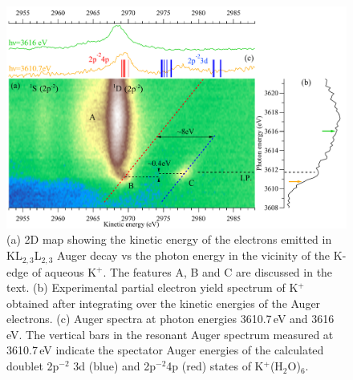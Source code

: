 \begin{figure}[h!]
\centering
\includegraphics[scale=0.55]{figures/k_2dmap.pdf}
\caption{(a) 2D map showing the kinetic energy of the electrons emitted in
KL$_{2,3}$L$_{2,3}$ Auger decay vs the photon energy in the vicinity of the K-edge of aqueous K$^{+}$. The features A, B and C are discussed in the text.
(b) Experimental partial electron yield spectrum of K$^{+}$ obtained after
integrating over the kinetic energies of the Auger electrons.
(c) Auger spectra at photon energies 3610.7\,eV and 3616\,eV. The vertical bars
in the resonant Auger spectrum measured at 3610.7\,eV indicate the spectator Auger energies of the calculated doublet 2p$^{-2}$ 3d (blue) and 2p$^{-2}$4p (red) states of K$^{+}$(H$_2$O)$_6$.}
\label{fg:2dmap_k}
\end{figure}




